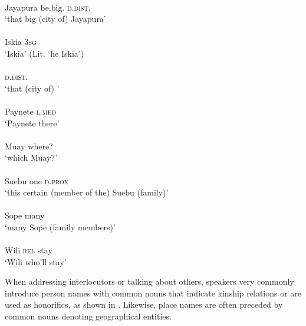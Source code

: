  
\ea
\label{Example_5.13}
\gll {}  \\ 
Jayapura be.big. \textsc{d.dist}.  \\
\glt ‘that big (city of) Jayapura’\\
\z 
\ea
\label{Example_5.14} 
\gll  {} \\
Iskia \textsc{3sg}  \\
\glt ‘Iskia’ (Lit. ‘he Iskia’)\\
\z 
\ea
\label{Example_5.15}
\gll  {} \\
 \textsc{d.dist}.  \\
 \glt ‘that (city of) ’\\
\z 
\ea
\label{Example_5.16}
\gll  {} \\
Paynete \textsc{l.med} \\
 \glt ‘Paynete there’\\
\z 
\ea
\label{Example_5.17}
\gll {} \\
Muay where? \\
 \glt ‘which Muay?’\\
\z 
\ea
\label{Example_5.18}
\gll {}  \\ 
Suebu one \textsc{d.prox}  \\
 \glt ‘this certain (member of the) Suebu (family)’\\
\z 
\ea
\label{Example_5.19}
\gll {} \\
Sope many  \\
\glt ‘many Sope (family members)’\\
\z 
\ea
\label{Example_5.20}
\gll {}  \\
Wili \textsc{rel} stay\\
\glt ‘Wili who’ll stay’\\
\z 


When addressing interlocutors or talking about others, speakers very commonly introduce person names with common nouns that indicate kinship relations or are used as honorifics, as shown in . Likewise, place names are often preceded by common nouns denoting geographical entities.


